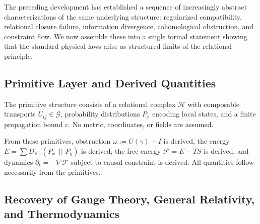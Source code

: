 \documentclass[12pt,a4paper,openany]{book}
\theoremstyle{plain}
\theoremstyle{definition}
\theoremstyle{remark}
\begin{document}
The preceding development has established a sequence of increasingly abstract characterizations of the same underlying structure: regularized compatibility, relational closure failure, information divergence, cohomological obstruction, and constraint flow. We now assemble these into a single formal statement showing that the standard physical laws arise as structured limits of the relational principle.

\subsection{Primitive Layer and Derived Quantities}

The primitive structure consists of a relational complex $\mathcal{H}$ with composable transports $U_{ij} \in \mathcal{G}$, probability distributions $P_x$ encoding local states, and a finite propagation bound $c$. No metric, coordinates, or fields are assumed.

From these primitives, obstruction $\omega := U(\gamma) - I$ is derived, the energy $E = \sum D_{\mathrm{KL}}(P_x \,\|\, P_y)$ is derived, the free energy $\mathcal{F} = E - TS$ is derived, and dynamics $\partial_t = -\nabla\mathcal{F}$ subject to causal constraint is derived. All quantities follow necessarily from the primitives.

\subsection{Recovery of Gauge Theory, General Relativity, and Thermodynamics}
\end{document}
